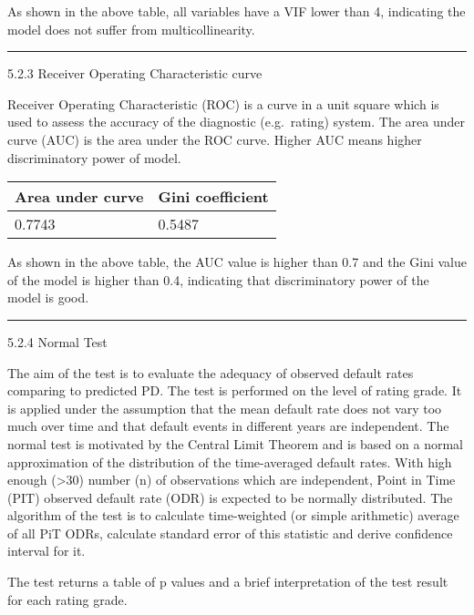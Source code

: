 As shown in the above table, all variables have a VIF lower than 4,
indicating the model does not suffer from multicollinearity.

\begin{center}\rule{0.5\linewidth}{\linethickness}\end{center}

5.2.3 Receiver Operating Characteristic curve

Receiver Operating Characteristic (ROC) is a curve in a unit square
which is used to assess the accuracy of the diagnostic (e.g.~rating)
system. The area under curve (AUC) is the area under the ROC curve.
Higher AUC means higher discriminatory power of model.

\begin{longtable}[]{@{}ll@{}}
\toprule
Area under curve & Gini coefficient\tabularnewline
\midrule
\endhead
0.7743 & 0.5487\tabularnewline
\bottomrule
\end{longtable}

As shown in the above table, the AUC value is higher than 0.7 and the
Gini value of the model is higher than 0.4, indicating that
discriminatory power of the model is good.

\begin{center}\rule{0.5\linewidth}{\linethickness}\end{center}

5.2.4 Normal Test

The aim of the test is to evaluate the adequacy of observed default
rates comparing to predicted PD. The test is performed on the level of
rating grade. It is applied under the assumption that the mean default
rate does not vary too much over time and that default events in
different years are independent. The normal test is motivated by the
Central Limit Theorem and is based on a normal approximation of the
distribution of the time-averaged default rates. With high enough
(\textgreater{}30) number (n) of observations which are independent,
Point in Time (PIT) observed default rate (ODR) is expected to be
normally distributed. The algorithm of the test is to calculate
time-weighted (or simple arithmetic) average of all PiT ODRs, calculate
standard error of this statistic and derive confidence interval for it.

The test returns a table of p values and a brief interpretation of the
test result for each rating grade.

